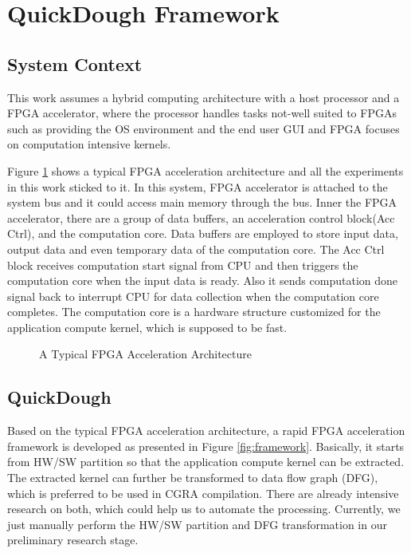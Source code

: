 \section{QuickDough Framework}\label{sec:framework}

\subsection{System Context}
This work assumes a hybrid computing architecture with a host processor and a FPGA accelerator, where the processor handles tasks not-well suited to FPGAs such as providing the OS environment and the end user GUI and FPGA focuses on computation intensive kernels.

Figure \ref{fig:typical-FPGA-accelerator} shows a typical FPGA acceleration architecture and all the experiments in this work sticked to it. In this system, FPGA accelerator is attached to the system bus and it could access main memory through the bus. Inner the FPGA accelerator, there are a
group of data buffers, an acceleration control block(Acc Ctrl), and the computation core. Data buffers are employed to store input data, output data and even temporary data of the computation core. The Acc Ctrl block receives computation start signal from CPU and then triggers the computation core when the input data is ready. Also it sends computation done signal back to interrupt CPU for data collection when the computation core completes. The computation core is a hardware structure customized for the application compute kernel, which is supposed to be fast.  

\begin{figure}[H]
    \caption{A Typical FPGA Acceleration Architecture}
    \label{fig:typical-FPGA-accelerator}
\end{figure}

\subsection{QuickDough}
Based on the typical FPGA acceleration architecture, a rapid FPGA acceleration framework is developed as presented in Figure \ref{fig:framework}. Basically, it starts from HW/SW partition so that the application compute kernel can be extracted. The extracted kernel can further be transformed to data flow graph (DFG), which is preferred to be used in CGRA compilation. There are already intensive research on both, which could help us to automate the processing. Currently, we just manually perform the HW/SW partition and DFG transformation in our preliminary research stage. 

